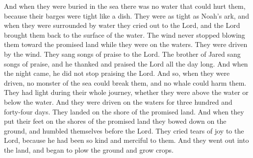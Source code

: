 And when they were buried in the sea there was no water that could hurt them, because their barges were tight like a dish. They were as tight as Noah's ark, and when they were surrounded by water they cried out to the Lord, and the Lord brought them back to the surface of the water.
\bverse \iffalse And it came to pass that the wind did never cease to blow towards the promised land while they were upon the waters; and thus they were driven forth before the wind. \fi
The wind never stopped blowing them toward the promised land while they were on the waters. They were driven by the wind.
\bverse \iffalse And they did sing praises unto the Lord; yea, the brother of Jared did sing praises unto the Lord, and he did thank and praise the Lord all the day long; and when the night came, they did not cease to praise the Lord. \fi
They sang songs of praise to the Lord. The brother of Jared sang songs of praise, and he thanked and praised the Lord all the day long. And when the night came, he did not stop praising the Lord.
\bverse \iffalse And thus they were driven forth; and no monster of the sea could break them, neither whale that could mar them; and they did have light continually, whether it was above the water or under the water. \fi
And so, when they were driven, no monster of the sea could break them, and no whale could harm them. They had light during their whole journey, whether they were above the water or below the water.
\bverse \iffalse And thus they were driven forth, three hundred and forty and four days upon the water. \fi
And they were driven on the waters for three hundred and forty-four days.
\bverse \iffalse And they did land upon the shore of the promised land. And when they had set their feet upon the shores of the promised land they bowed themselves down upon the face of the land, and did humble themselves before the Lord, and did shed tears of joy before the Lord, because of the multitude of his tender mercies over them. \fi
They landed on the shore of the promised land. And when they put their feet on the shores of the promised land they bowed down on the ground, and humbled themselves before the Lord. They cried tears of joy to the Lord, because he had been so kind and merciful to them.
\bverse \iffalse And it came to pass that they went forth upon the face of the land, and began to till the earth. \fi
And they went out into the land, and began to plow the ground and grow crops.
\bverse \iffalse And Jared had four sons; and they were called Jacom, and Gilgah, and Mahah, and Orihah. \fi
